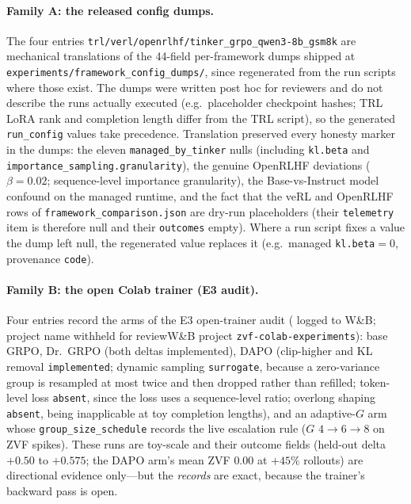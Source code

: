 \paragraph{Family A: the released config dumps.}
The four entries \texttt{trl/verl/openrlhf/tinker_grpo_qwen3-8b_gsm8k} are
mechanical translations of the 44-field per-framework dumps shipped at
\texttt{experiments/framework_config_dumps/}, since regenerated from the run
scripts where those exist. The dumps were written post hoc for reviewers and
do not describe the runs actually executed (e.g.\ placeholder checkpoint
hashes; TRL LoRA rank and completion length differ from the TRL script), so
the generated \texttt{run\_config} values take precedence. Translation preserved every honesty marker in the
dumps: the eleven \texttt{managed_by_tinker} nulls (including \texttt{kl.beta}
and \texttt{importance_sampling.granularity}), the genuine OpenRLHF deviations
($\beta{=}0.02$; sequence-level importance granularity), the Base-vs-Instruct
model confound on the managed runtime, and the fact that the veRL and OpenRLHF
rows of \texttt{framework_comparison.json} are dry-run placeholders (their
\texttt{telemetry} item is therefore null and their \texttt{outcomes} empty).
Where a run script fixes a value the dump left null, the regenerated value
replaces it (e.g.\ managed \texttt{kl.beta}${}=0$, provenance \texttt{code}).

\paragraph{Family B: the open Colab trainer (E3 audit).}
Four entries record the arms of the E3 open-trainer audit (\ifdefined\ANONYMOUSBUILD
logged to W\&B; project name withheld for review\else W\&B project
\texttt{zvf-colab-experiments}\fi): base GRPO, Dr.~GRPO (both deltas
implemented), DAPO (clip-higher and KL removal \texttt{implemented}; dynamic
sampling \texttt{surrogate}, because a zero-variance group is resampled at most
twice and then dropped rather than refilled; token-level loss \texttt{absent},
since the loss uses a sequence-level ratio; overlong shaping \texttt{absent},
being inapplicable at toy completion lengths), and an adaptive-$G$ arm whose
\texttt{group_size_schedule} records the live escalation rule ($G$
$4{\to}6{\to}8$ on ZVF spikes). These runs are toy-scale and their outcome
fields (held-out delta $+0.50$ to $+0.575$; the DAPO arm's mean ZVF $0.00$ at
$+45\%$ rollouts) are directional evidence only---but the \emph{records} are
exact, because the trainer's backward pass is open.


